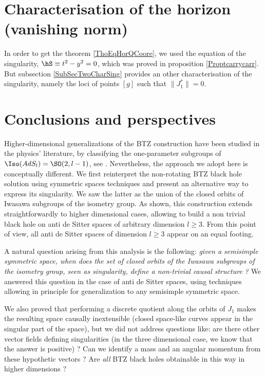 \section{Characterisation of the horizon (vanishing norm)}
\label{SecVanNormChar}

In order to get the theorem \ref{ThoEqHorQCoore}, we used the equation of the singularity, $\hS\equiv t^2-y^2=0$, which was proved in proposition \ref{Proptcarrycarr}. But subsection \ref{SubSecTwoCharSing} provides an other characterisation of the singularity, namely the loci of points $[g]$ such that $\| J_1^* \|=0$.

\section{Conclusions and perspectives}		\label{SecConcPerspAd}

Higher-dimensional generalizations of the BTZ construction have been studied in the physics' literature, by classifying the one-parameter subgroups of $\Iso(AdS_l)=\SO(2,l-1)$, see \cite{Figueroa,AdSBH,Madden,BanadosIQxXuEh,Aminneborg,HolstPeldan}.  Nevertheless, the approach we adopt here is conceptually different. We first reinterpret the non-rotating BTZ black hole solution using symmetric spaces techniques and present an alternative way to express its singularity.  We saw the latter as the union of the closed orbits of Iwasawa subgroups of the isometry group.  As shown, this construction extends straightforwardly to higher dimensional cases, allowing to build a non trivial black hole on anti de Sitter spaces of arbitrary dimension $l\geq 3$.  From this point of view, all anti de Sitter spaces of dimension $l\geq 3$ appear on an equal footing.

A natural question arising from this analysis is the following: \emph{given a semisimple symmetric space, when does the set of closed orbits of the Iwasawa subgroups of the isometry group, seen as singularity, define a non-trivial causal structure ?} We answered this question in the case of anti de Sitter spaces, using techniques allowing in principle for generalization to any semisimple symmetric space.

We also proved that performing a discrete quotient along the orbits of $J_1$ makes the resulting space causally inextensible (closed space-like curves appear in the singular part of the space), but we did not address  questions like: are there other vector fields defining singularities (in the three dimensional case, we know that the answer is positive) ? Can we identify a mass and an angular momentum from these hypothetic vectors ? Are \emph{all} BTZ black holes obtainable in this way in higher dimensions ?

